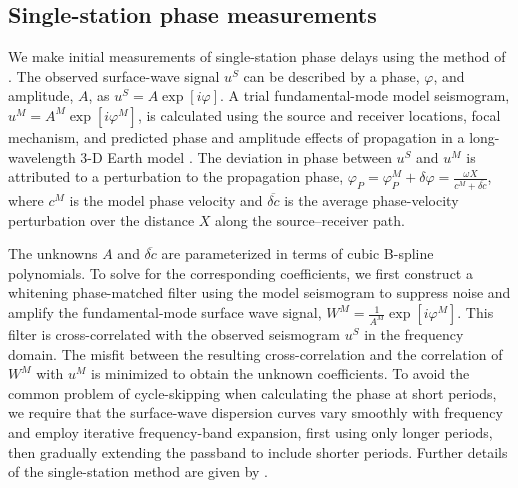 \documentclass[12pt,oneside]{book}
\begin{document}
\subsection{Single-station phase measurements}
We make initial measurements of single-station phase delays using the method of \citet{Ekstrom1997}. The observed surface-wave signal $u^S$ can be described by a phase, $\varphi$, and amplitude, $A$, as $u^S = A \exp{\left[i\varphi\right]}$. A trial fundamental-mode model seismogram, $u^M = A^M \exp{\left[i\varphi^M\right]}$, is calculated using the source and receiver locations, focal mechanism, and predicted phase and amplitude effects of propagation in a long-wavelength 3\nobreakdash-D Earth model \citep[SH8U4L8;][]{DziewonskiWoodward1992}. The deviation in phase between $u^S$ and $u^M$ is attributed to a perturbation to the propagation phase, $\varphi_P = \varphi_P^M + \delta\varphi = \frac{\omega X}{c^M + \overline{\delta c}}$, where $c^M$ is the model phase velocity and $\overline{\delta c}$ is the average phase-velocity perturbation over the distance $X$ along the source--receiver path. 

The unknowns $A$ and $\overline{\delta c}$ are parameterized in terms of cubic B-spline polynomials. To solve for the corresponding coefficients, we first construct a whitening phase-matched filter using the model seismogram to suppress noise and amplify the fundamental-mode surface wave signal, $W^M = \frac{1}{A^M} \exp{\left[i\varphi^M\right]}$.  This filter is cross-correlated with the observed seismogram $u^S$ in the frequency domain.  The misfit between the resulting cross-correlation and the correlation of $W^M$ with $u^M$ is minimized to obtain the unknown coefficients. To avoid the common problem of cycle-skipping when calculating the phase at short periods, we require that the surface-wave dispersion curves vary smoothly with frequency and employ iterative frequency-band expansion, first using only longer periods, then gradually extending the passband to include shorter periods. Further details of the single-station method are given by \citet{Ekstrom1997}. 
\end{document}
